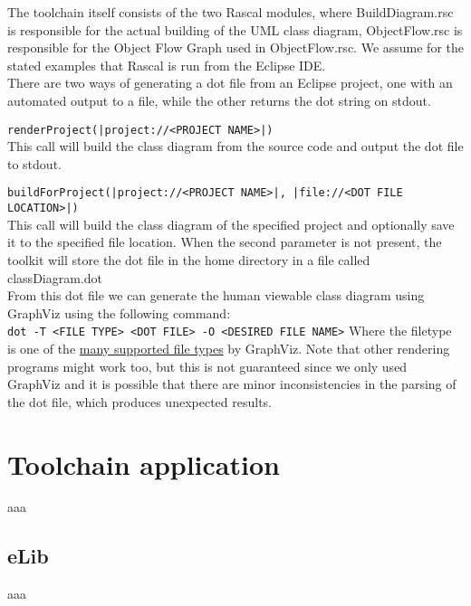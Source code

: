\documentclass[a4paper,twoside,11pt]{article}
\begin{document}
The toolchain itself consists of the two Rascal modules, where {\sc BuildDiagram.rsc} is responsible for the actual building of the UML class diagram, {\sc ObjectFlow.rsc} is responsible for the Object Flow Graph used in {\sc ObjectFlow.rsc}.  We assume for the stated examples that Rascal is run from the Eclipse IDE. \\

There are two ways of generating a dot file from an Eclipse project, one with an automated output to a file, while the other returns the dot string on stdout. \\

\bigskip

{\tt renderProject(|project://<PROJECT NAME>|)}\\
This call will build the class diagram from the source code and output the dot file to stdout. \\

\bigskip

{\tt buildForProject(|project://<PROJECT NAME>|, |file://<DOT FILE LOCATION>|)} \\
This call will build the class diagram of the specified project and optionally save it to the specified file location. When the second parameter is not present, the toolkit will store the dot file in the home directory in a file called {\sc classDiagram.dot}\\

From this dot file we can generate the human viewable class diagram using GraphViz using the following command: \\
{\tt dot -T <FILE TYPE> <DOT FILE> -O <DESIRED FILE NAME>}
Where the filetype is one of the \href{http://www.graphviz.org/doc/info/output.html}{many supported file types} by GraphViz. Note that other rendering programs might work too, but this is not guaranteed since we only used GraphViz and it is possible that there are minor inconsistencies in the parsing of the dot file, which produces unexpected results.


\section{Toolchain application}
\label{sec:toolapplication}
aaa



\subsection{eLib}
\label{sec:elib}
aaa
\end{document}
